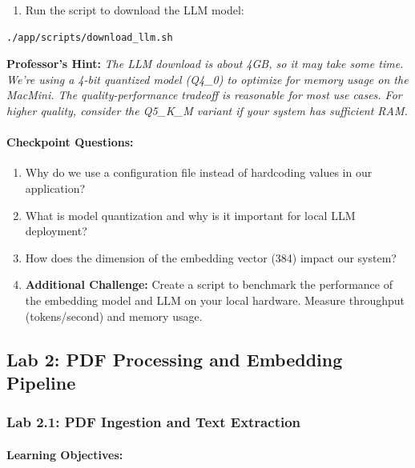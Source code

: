 \documentclass[
  screen,review,acmlarge]{acmart}
\providecommand{\tightlist}{%
  \setlength{\itemsep}{0pt}\setlength{\parskip}{0pt}}
\begin{document}
\begin{enumerate}
\def\labelenumi{\arabic{enumi}.}
\setcounter{enumi}{7}
\tightlist
\item
  Run the script to download the LLM model:
\end{enumerate}

\begin{lstlisting}[language=bash]
./app/scripts/download_llm.sh
\end{lstlisting}

\textbf{Professor's Hint:} \emph{The LLM download is about 4GB, so it may take some time. We're using a 4-bit quantized model (Q4\_0) to optimize for memory usage on the MacMini. The quality-performance tradeoff is reasonable for most use cases. For higher quality, consider the Q5\_K\_M variant if your system has sufficient RAM.}

\paragraph{Checkpoint Questions:}\label{checkpoint-questions-1}

\begin{enumerate}
\def\labelenumi{\arabic{enumi}.}
\tightlist
\item
  Why do we use a configuration file instead of hardcoding values in our application?
\item
  What is model quantization and why is it important for local LLM deployment?
\item
  How does the dimension of the embedding vector (384) impact our system?
\item
  \textbf{Additional Challenge:} Create a script to benchmark the performance of the embedding model and LLM on your local hardware. Measure throughput (tokens/second) and memory usage.
\end{enumerate}

\subsection{Lab 2: PDF Processing and Embedding Pipeline}\label{lab-2-pdf-processing-and-embedding-pipeline}

\subsubsection{Lab 2.1: PDF Ingestion and Text Extraction}\label{lab-2.1-pdf-ingestion-and-text-extraction}

\paragraph{Learning Objectives:}\label{learning-objectives-2}
\end{document}
